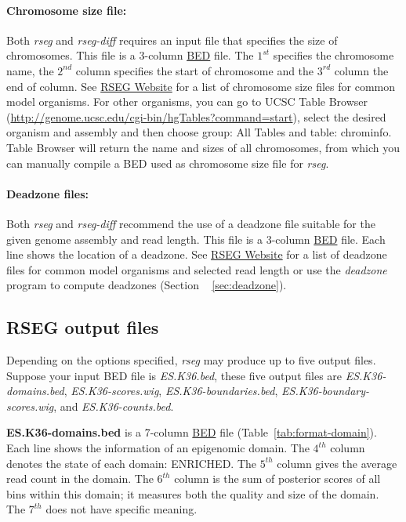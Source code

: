\documentclass[11pt]{report}
\begin{document}
\paragraph{Chromosome size file:} Both \textit{rseg} and
\textit{rseg-diff} requires an input file that specifies the size of
chromosomes. This file is a 3-column
\href{http://genome.ucsc.edu/FAQ/FAQformat.html#format1}{BED}
file. The $1^{st}$ specifies the chromosome name, the $2^{nd}$ column
specifies the start of chromosome and the $3^{rd}$ column the end of
column. See \href{http://smithlab.cmb.usc.edu/histone/software/}{RSEG
  Website} for a list of chromosome size files for common model
organisms. For other organisms, you can go to UCSC Table Browser
(\url{http://genome.ucsc.edu/cgi-bin/hgTables?command=start}), select
the desired organism and assembly and then choose group: All Tables
and table: chrominfo. Table Browser will return the name and sizes of
all chromosomes, from which you can manually compile a BED used as
chromosome size file for \textit{rseg}.

\paragraph{Deadzone files:} Both \textit{rseg} and \textit{rseg-diff}
recommend the use of a deadzone file suitable for the given genome
assembly and read length. This file is a 3-column
\href{http://genome.ucsc.edu/FAQ/FAQformat.html#format1}{BED}
file. Each line shows the location of a deadzone. See
\href{http://smithlab.cmb.usc.edu/histone/software}{RSEG Website} for
a list of deadzone files for common model organisms and selected read
length or use the \textit{deadzone} program to compute deadzones
(Section ~ \ref{sec:deadzone}).
 
\subsection{RSEG output files}
\label{sec:rseg-output}

Depending on the options specified, \textit{rseg} may produce up to five output
files. Suppose your input BED file is \textit{ES.K36.bed}, these five output
files are \textit{ES.K36-domains.bed}, \textit{ES.K36-scores.wig},
\textit{ES.K36-boundaries.bed}, \textit{ES.K36-boundary-scores.wig},
and \textit{ES.K36-counts.bed}.

\textbf{ES.K36-domains.bed} is a 7-column
\href{http://genome.ucsc.edu/FAQ/FAQformat.html#format1}{BED} file
(Table~\ref{tab:format-domain}). Each line shows the information of an
epigenomic domain. The $4^{th}$ column denotes the state of each
domain: ENRICHED.  The $5^{th}$ column gives the average read count in
the domain. The $6^{th}$ column is the sum of posterior scores of all
bins within this domain; it measures both the quality and size of the
domain. The $7^{th}$ does not have specific meaning.
\end{document}
